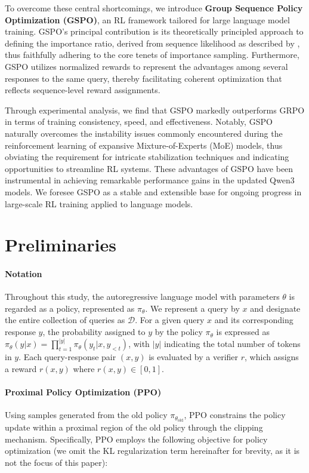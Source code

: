 To overcome these central shortcomings, we introduce \textbf{Group Sequence Policy Optimization (GSPO)}, an RL framework tailored for large language model training. GSPO's principal contribution is its theoretically principled approach to defining the importance ratio, derived from sequence likelihood as described by \citet{click}, thus faithfully adhering to the core tenets of importance sampling. Furthermore, GSPO utilizes normalized rewards to represent the advantages among several responses to the same query, thereby facilitating coherent optimization that reflects sequence-level reward assignments.

Through experimental analysis, we find that GSPO markedly outperforms GRPO in terms of training consistency, speed, and effectiveness. Notably, GSPO naturally overcomes the instability issues commonly encountered during the reinforcement learning of expansive Mixture-of-Experts (MoE) models, thus obviating the requirement for intricate stabilization techniques and indicating opportunities to streamline RL systems. These advantages of GSPO have been instrumental in achieving remarkable performance gains in the updated Qwen3 models. We foresee GSPO as a stable and extensible base for ongoing progress in large-scale RL training applied to language models.

\section{Preliminaries}

\paragraph{Notation}
Throughout this study, the autoregressive language model with parameters $\theta$ is regarded as a policy, represented as $\pi_\theta$. We represent a query by $x$ and designate the entire collection of queries as $\mathcal{D}$. For a given query $x$ and its corresponding response $y$, the probability assigned to $y$ by the policy $\pi_\theta$ is expressed as $\pi_\theta (y | x) = \prod_{t=1}^{|y|} \pi_\theta (y_t | x, y_{<t})$, with $|y|$ indicating the total number of tokens in $y$. Each query-response pair $(x, y)$ is evaluated by a verifier $r$, which assigns a reward $r(x, y)$ where $r(x, y) \in [0, 1]$.

\paragraph{Proximal Policy Optimization (PPO)} Using samples generated from the old policy $\pi_{\theta_\text{old}}$, PPO \citep{ppo} constrains the policy update within a proximal region of the old policy through the clipping mechanism. Specifically, PPO employs the following objective for policy optimization (we omit the KL regularization term hereinafter for brevity, as it is not the focus of this paper):

